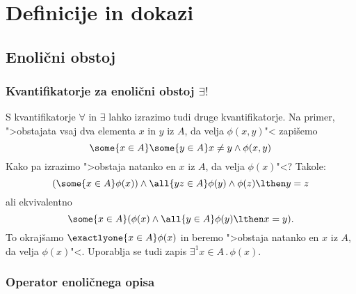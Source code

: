 \chapter{Definicije in dokazi}

\section{Enolični obstoj}

\subsection{Kvantifikatorje za enolični obstoj $\exists!$}

S kvantifikatorje $\forall$ in $\exists$ lahko izrazimo tudi druge kvantifikatorje.
Na primer, ">obstajata vsaj dva elementa $x$ in $y$ iz $A$, da velja $\phi(x,y)$"< zapišemo
%
\begin{equation*}
    \some{x \in A} \some{y \in A} x \neq y \land \phi(x,y)
\end{equation*}
%
Kako pa izrazimo ">obstaja natanko en $x$ iz $A$, da velja $\phi(x)$"<? Takole:
%
\begin{equation*}
  (\some{x \in A} \phi(x)) \land \all{y z \in A} \phi(y) \land \phi(z) \lthen y = z
\end{equation*}
%
ali ekvivalentno
%
\begin{equation*}
    \some{x \in A} (\phi(x) \land \all{y \in A} \phi(y) \lthen x = y).
\end{equation*}
%
To okrajšamo $\exactlyone{x \in A} \phi(x)$ in beremo ">obstaja natanko en $x$ iz $A$, da velja $\phi(x)$"<.
%
Uporablja se tudi zapis $\exists^1 x \in A \,.\, \phi(x)$.

\subsection{Operator enoličnega opisa}

